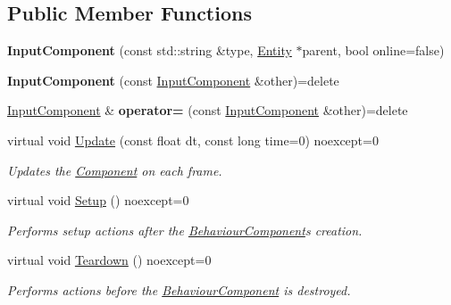 \subsection*{Public Member Functions}
\begin{DoxyCompactItemize}
\item 
\mbox{\label{class_blade_1_1_input_component_a16ef2c4f95e1597411140ddba84e785e}} 
{\bfseries Input\+Component} (const std\+::string \&type, \hyperlink{class_blade_1_1_entity}{Entity} $\ast$parent, bool online=false)
\item 
\mbox{\label{class_blade_1_1_input_component_a3ec4713fef0a0903785402a5d6e469ca}} 
{\bfseries Input\+Component} (const \hyperlink{class_blade_1_1_input_component}{Input\+Component} \&other)=delete
\item 
\mbox{\label{class_blade_1_1_input_component_a1525696f442c056c06e5018606bf099b}} 
\hyperlink{class_blade_1_1_input_component}{Input\+Component} \& {\bfseries operator=} (const \hyperlink{class_blade_1_1_input_component}{Input\+Component} \&other)=delete
\item 
virtual void \hyperlink{class_blade_1_1_input_component_aa7869b52200bb0a8c0c304fdf6147098}{Update} (const float dt, const long time=0) noexcept=0
\begin{DoxyCompactList}\small\item\em Updates the \hyperlink{class_blade_1_1_component}{Component} on each frame. \end{DoxyCompactList}\item 
\mbox{\label{class_blade_1_1_input_component_acd17481f4cf26bf9f4bd2c480d97fca1}} 
virtual void \hyperlink{class_blade_1_1_input_component_acd17481f4cf26bf9f4bd2c480d97fca1}{Setup} () noexcept=0
\begin{DoxyCompactList}\small\item\em Performs setup actions after the \hyperlink{class_blade_1_1_behaviour_component}{Behaviour\+Component}\textquotesingle{}s creation. \end{DoxyCompactList}\item 
\mbox{\label{class_blade_1_1_input_component_aa3f06eb4474d404eb91ab65bad62f4d5}} 
virtual void \hyperlink{class_blade_1_1_input_component_aa3f06eb4474d404eb91ab65bad62f4d5}{Teardown} () noexcept=0
\begin{DoxyCompactList}\small\item\em Performs actions before the \hyperlink{class_blade_1_1_behaviour_component}{Behaviour\+Component} is destroyed. \end{DoxyCompactList}\end{DoxyCompactItemize}
